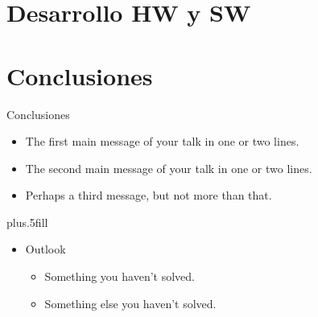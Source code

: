 \documentclass{beamer}
\begin{document}
\section{Desarrollo HW y SW}

\appendix
\section*{Conclusiones}

\begin{frame}{Conclusiones}

  \begin{itemize}
  \item
    The \alert{first main message} of your talk in one or two lines.
  \item
    The \alert{second main message} of your talk in one or two lines.
  \item
    Perhaps a \alert{third message}, but not more than that.
  \end{itemize}
  
  \vskip0pt plus.5fill
  \begin{itemize}
  \item
    Outlook
    \begin{itemize}
    \item
      Something you haven't solved.
    \item
      Something else you haven't solved.
    \end{itemize}
  \end{itemize}
\end{frame}
\end{document}
